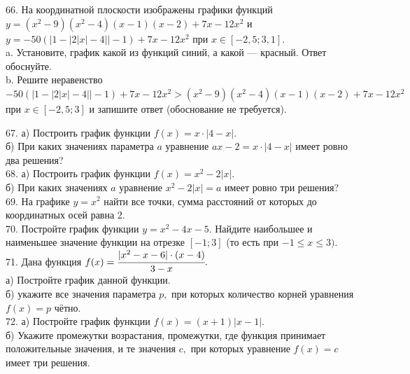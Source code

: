 \documentclass[12pt]{article}
\begin{document}
66. На координатной плоскости изображены графики функций $y=(x^2-9)(x^2-4)(x-1)(x-2)+7x-12x^2$ и $y=-50(|1-|2|x|-4||-1)+7x-12x^2$ при
$x\in[-2,5;3,1].$\\
a. Установите, график какой из функций синий, а какой --- красный. Ответ обоснуйте.\\
b. Решите неравенство  $-50(|1-|2|x|-4||-1)+7x-12x^2 >(x^2-9)(x^2-4)(x-1)(x-2)+7x-12x^2$ при
$x\in[-2,5;3]$ и запишите ответ (обоснование не требуется).
\begin{center}\end{center}
67. а) Построить график функции $f(x)=x\cdot|4-x|.$\\
б) При каких значениях параметра $a$ уравнение $ax-2=x\cdot|4-x|$ имеет ровно два решения?\\
68. а) Построить график функции $f(x)=x^2-2|x|.$\\
б) При каких значениях $a$ уравнение $x^2-2|x|=a$ имеет ровно три решения?\\
69. На графике $y=x^2$ найти все точки, сумма расстояний от которых до координатных осей равна 2.\\
70. Постройте график функции $y=x^2-4x-5.$ Найдите наибольшее и наименьшее значение функции на отрезке $[-1;3]$ (то есть при $-1\leqslant x \leqslant 3).$\\
71. Дана функция $f(x)=\cfrac{|x^2-x-6|\cdot(x-4)}{3-x}.$\\
а) Постройте график данной функции.\\
б) укажите все значения параметра $p,$ при которых количество корней уравнения $f(x)=p$ чётно.\\
72. а) Постройте график функции $f(x)=(x+1)|x-1|.$\\
б) Укажите промежутки возрастания, промежутки, где функция принимает положительные значения, и те значения $c,$ при которых уравнение $f(x)=c$ имеет три решения.\\
\end{document}

